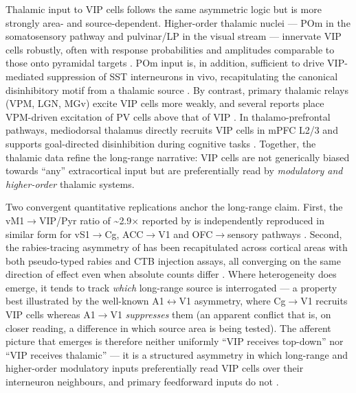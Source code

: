 \documentclass[11pt]{article}
\let\origrightarrow\rightarrow
\def\rightarrow{\ensuremath{\origrightarrow}}
\let\origleftrightarrow\leftrightarrow
\def\leftrightarrow{\ensuremath{\origleftrightarrow}}
\begin{document}
Thalamic input to VIP cells follows the same asymmetric logic but is more strongly area- and source-dependent. Higher-order thalamic nuclei --- POm in the somatosensory pathway and pulvinar/LP in the visual stream --- innervate VIP cells robustly, often with response probabilities and amplitudes comparable to those onto pyramidal targets \citep{Williams2019, Anastasiades2021a, Ramamurthy2023}. POm input is, in addition, sufficient to drive VIP-mediated suppression of SST interneurons in vivo, recapitulating the canonical disinhibitory motif from a thalamic source \citep{Williams2019, Audette2018}. By contrast, primary thalamic relays (VPM, LGN, MGv) excite VIP cells more weakly, and several reports place VPM-driven excitation of PV cells above that of VIP \citep{Cruikshank2012, Ji2016}. In thalamo-prefrontal pathways, mediodorsal thalamus directly recruits VIP cells in mPFC L2/3 and supports goal-directed disinhibition during cognitive tasks \citep{Anastasiades2021a, Kim2017}. Together, the thalamic data refine the long-range narrative: VIP cells are not generically biased towards ``any'' extracortical input but are preferentially read by \textit{modulatory and higher-order} thalamic systems.

Two convergent quantitative replications anchor the long-range claim. First, the vM1\rightarrow VIP/Pyr ratio of {\textasciitilde}2.9$\times$ reported by \citet{Lee2013} is independently reproduced in similar form for vS1\rightarrow Cg, ACC\rightarrow V1 and OFC\rightarrow sensory pathways \citep{Zhang2014, Bilash2023, Stachniak2023, Pi2013, Williams2019}. Second, the rabies-tracing asymmetry of \citet{Wall2016} has been recapitulated across cortical areas with both pseudo-typed rabies and CTB injection assays, all converging on the same direction of effect even when absolute counts differ \citep{Wall2016, Audette2018, Anastasiades2021a, Ramamurthy2023, Williams2019}. Where heterogeneity does emerge, it tends to track \textit{which} long-range source is interrogated --- a property best illustrated by the well-known A1\leftrightarrow V1 asymmetry, where Cg\rightarrow V1 recruits VIP cells \citep{Zhang2014} whereas A1\rightarrow V1 \textit{suppresses} them \citep{Ibrahim2016} (an apparent conflict that is, on closer reading, a difference in which source area is being tested). The afferent picture that emerges is therefore neither uniformly ``VIP receives top-down'' nor ``VIP receives thalamic'' --- it is a structured asymmetry in which long-range and higher-order modulatory inputs preferentially read VIP cells over their interneuron neighbours, and primary feedforward inputs do not \citep{Wall2016, Lee2013, Williams2019, Cruikshank2012, Anastasiades2021a, Audette2018, Bastos2023a}.
\end{document}
